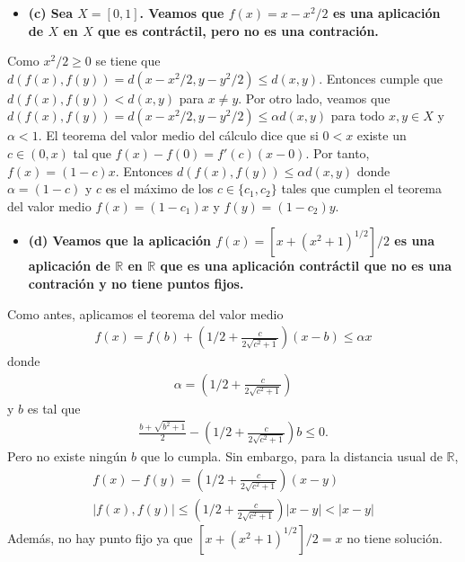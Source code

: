 \documentclass{article}
\begin{document}
\begin{itemize}
\item \bf (c) \rm Sea $X=[0,1]$. Veamos que $f(x)=x-x^2/2$ es una aplicación de $X$ en $X$ que es contráctil, pero no es una contración.
\end{itemize}
Como $x^2/2\geq 0$ se tiene que $d(f(x),f(y))=d(x-x^2/2,y-y^2/2)\leq d(x,y)$. Entonces cumple que $d(f(x),f(y))< d(x,y)$ para $x\neq y$.
Por otro lado, veamos que $d(f(x),f(y))=d(x-x^2/2,y-y^2/2)\leq \alpha d(x,y)$ para todo $x,y\in X$ y $\alpha<1$. El teorema del valor medio del cálculo dice que si $0<x$ existe un $c\in (0,x)$ tal que  $f(x)-f(0)=f'(c)(x-0)$. Por tanto, $f(x)=(1-c)x$. Entonces $d(f(x),f(y))\leq \alpha d(x,y)$ donde $\alpha=(1-c)$ y $c$ es el máximo de los $c\in \{c_1,c_2\}$ tales que cumplen el teorema del valor medio $f(x)=(1-c_1)x$ y $f(y)=(1-c_2)y$.
\begin{itemize}
\item \bf (d) \rm Veamos que la aplicación $f(x)=[x+(x^2+1)^{1/2}]/2$ es una aplicación de $\mathbb{R}$ en $\mathbb{R}$ que es una aplicación contráctil que no es una contración y no tiene puntos fijos.
\end{itemize}
Como antes, aplicamos el teorema del valor medio
\begin{eqnarray}
f(x)=f(b)+\left(1/2+\frac{c}{2\sqrt{c^2+1}}\right)(x-b)\leq\alpha x\nonumber
\end{eqnarray}
donde 
\begin{eqnarray}
\alpha=\left(1/2+\frac{c}{2\sqrt{c^2+1}}\right)\nonumber
\end{eqnarray}
y $b$ es tal que
\begin{eqnarray}
\frac{b+\sqrt{b^2+1}}{2}-\left(1/2+\frac{c}{2\sqrt{c^2+1}}\right)b\leq 0.\nonumber
\end{eqnarray}
Pero no existe ningún $b$ que lo cumpla. Sin embargo, para la distancia usual de $\mathbb{R}$,
\begin{eqnarray}
f(x)-f(y)=\left(1/2+\frac{c}{2\sqrt{c^2+1}}\right)(x-y)\nonumber\\
|f(x),f(y)|\leq \left(1/2+\frac{c}{2\sqrt{c^2+1}}\right)|x-y|<|x-y|\nonumber
\end{eqnarray}
Además, no hay punto fijo ya que $[x+(x^2+1)^{1/2}]/2=x$ no tiene solución.
\end{document}
